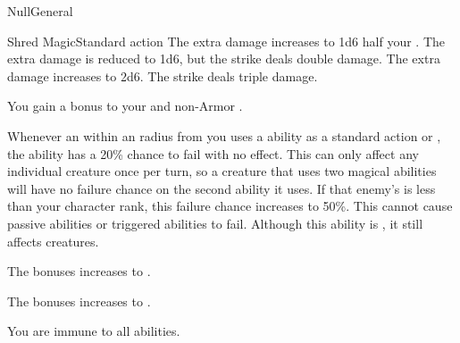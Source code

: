 \begin{feat}{Null}{General}
\begin{activeability}{Shred Magic}{Standard action}
      \rankline
       The extra damage increases to 1d6 \add half your .
       The extra damage is reduced to 1d6, but the strike deals double damage.
       The extra damage increases to 2d6.
       The strike deals triple damage.
    \end{activeability}

     You gain a  bonus to your  and non-Armor .

     Whenever an  within an \smallarea radius from you uses a \magical ability as a standard action or , the ability has a 20\% chance to fail with no effect.
    This can only affect any individual creature once per turn, so a creature that uses two magical abilities will have no failure chance on the second ability it uses.
    If that enemy's  is less than your character rank, this failure chance increases to 50\%.
    This cannot cause passive abilities or triggered abilities to fail.
    Although this ability is , it still affects  creatures.

     The bonuses increases to .

     The bonuses increases to .

     You are immune to all \magical abilities.
  \end{feat}

